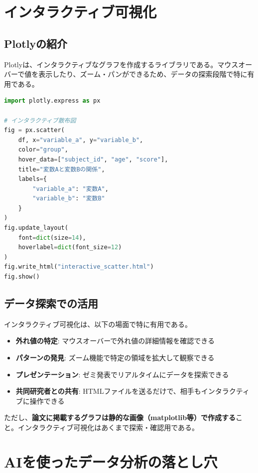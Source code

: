 \section{インタラクティブ可視化}

\subsection{Plotlyの紹介}

Plotlyは、インタラクティブなグラフを作成するライブラリである。マウスオーバーで値を表示したり、ズーム・パンができるため、データの探索段階で特に有用である。

\begin{lstlisting}[language=Python]
import plotly.express as px

# インタラクティブ散布図
fig = px.scatter(
    df, x="variable_a", y="variable_b",
    color="group",
    hover_data=["subject_id", "age", "score"],
    title="変数Aと変数Bの関係",
    labels={
        "variable_a": "変数A",
        "variable_b": "変数B"
    }
)
fig.update_layout(
    font=dict(size=14),
    hoverlabel=dict(font_size=12)
)
fig.write_html("interactive_scatter.html")
fig.show()
\end{lstlisting}

\subsection{データ探索での活用}

インタラクティブ可視化は、以下の場面で特に有用である。

\begin{itemize}
\item \textbf{外れ値の特定}: マウスオーバーで外れ値の詳細情報を確認できる
\item \textbf{パターンの発見}: ズーム機能で特定の領域を拡大して観察できる
\item \textbf{プレゼンテーション}: ゼミ発表でリアルタイムにデータを探索できる
\item \textbf{共同研究者との共有}: HTMLファイルを送るだけで、相手もインタラクティブに操作できる
\end{itemize}

ただし、\textbf{論文に掲載するグラフは静的な画像（matplotlib等）で作成する}こと。インタラクティブ可視化はあくまで探索・確認用である。

\section{AIを使ったデータ分析の落とし穴}

